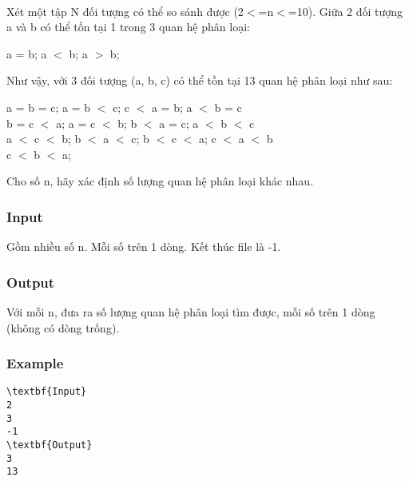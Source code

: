 

 

Xét một tập N đối tượng có thể so sánh được (2$<$=n$<$=10). Giữa 2 đối tượng a và b có thể tồn tại 1 trong 3 quan hệ phân loại:

a = b; a $<$ b; a $>$ b;

Như vậy, với 3 đối tượng (a, b, c) có thể tồn tại 13 quan hệ phân loại như sau:

a = b = c; a = b $<$ c; c $<$ a = b; a $<$ b = c
\\b = c $<$ a; a = c $<$ b; b $<$ a = c; a $<$ b $<$ c
\\a $<$ c $<$ b; b $<$ a $<$ c; b $<$ c $<$ a; c $<$ a $<$ b
\\c $<$ b $<$ a;

Cho số n, hãy xác định số lượng quan hệ phân loại khác nhau.

\subsubsection{Input}

Gồm nhiều số n. Mỗi số trên 1 dòng. Kết thúc file là -1.

\subsubsection{Output}

Với mỗi n, đưa ra số lượng quan hệ phân loại tìm được, mỗi số trên 1 dòng (không có dòng trống).

\subsubsection{Example}
\begin{verbatim}
\textbf{Input}
2
3
-1
\textbf{Output}
3
13
\end{verbatim}